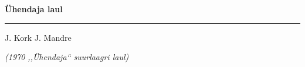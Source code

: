 \documentclass[10pt]{book}
\begin{document}
{
  \samepage
  \raggedbottom
  \raggedright
  \sloppy


  \vspace{0.2in}
    \centerline{
      \bfseries
      \large \"Uhendaja laul
    }
  \nopagebreak[4]
  \vspace{0.1in}
  \nopagebreak[4]
  \hrule height 0.05ex
  \nopagebreak[4]
  \vspace{-0.05in}

  {\footnotesize J. Kork \hfill J. Mandre }\\
  \vspace{0.01in}

  {\em {\footnotesize (1970 ,,\"Uhendaja{``} suurlaagri laul) } }
  \vspace{0.01in}


}
\end{document}
